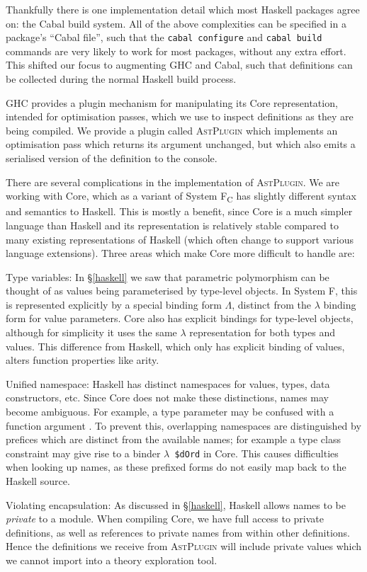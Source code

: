 Thankfully there is one implementation detail which most Haskell packages agree on: the Cabal build system. All of the above complexities can be specified in a package's ``Cabal file'', such that the \texttt{cabal configure} and \texttt{cabal build} commands are very likely to work for most packages, without any extra effort. This shifted our focus to augmenting GHC and Cabal, such that definitions can be collected during the normal Haskell build process.

GHC provides a plugin mechanism for manipulating its Core representation, intended for optimisation passes, which we use to inspect definitions as they are being compiled. We provide a plugin called \textsc{AstPlugin} which implements an optimisation pass which returns its argument unchanged, but which also emits a serialised version of the definition to the console.

There are several complications in the implementation of \textsc{AstPlugin}. We are working with Core, which as a variant of System F\textsubscript{C} \citep{sulzmann2007system} has slightly different syntax and semantics to Haskell. This is mostly a benefit, since Core is a much simpler language than Haskell and its representation is relatively stable compared to many existing representations of Haskell (which often change to support various language extensions). Three areas which make Core more difficult to handle are:

\begin{description}
  \item{Type variables}: In \S \ref{haskell} we saw that parametric polymorphism can be thought of as values being parameterised by type-level objects. In System F, this is represented explicitly by a special binding form $\Lambda$, distinct from the $\lambda$ binding form for value parameters. Core also has explicit bindings for type-level objects, although for simplicity it uses the same $\lambda$ representation for both types and values. This difference from Haskell, which only has explicit binding of values, alters function properties like arity.

  \item{Unified namespace}: Haskell has distinct namespaces for values, types, data constructors, etc. Since Core does not make these distinctions, names may become ambiguous. For example, a type parameter  may be confused with a function argument . To prevent this, overlapping namespaces are distinguished by prefices which are distinct from the available names; for example a type class constraint  may give rise to a binder \texttt{$\lambda$ \$dOrd} in Core. This causes difficulties when looking up names, as these prefixed forms do not easily map back to the Haskell source.

  \item{Violating encapsulation}: As discussed in \S \ref{haskell}, Haskell allows names to be \emph{private} to a module. When compiling Core, we have full access to private definitions, as well as references to private names from within other definitions. Hence the definitions we receive from \textsc{AstPlugin} will include private values which we cannot import into a theory exploration tool.
\end{description}


